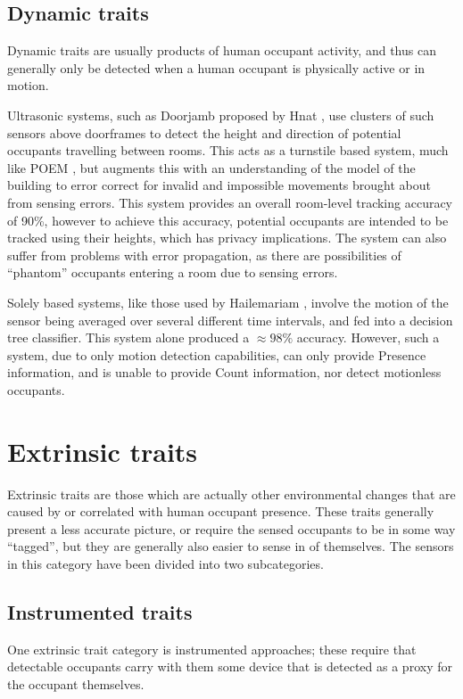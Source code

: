 \documentclass[../thesis/thesis.tex]{subfiles}
\begin{document}
\subsection{Dynamic traits}
\label{subsubsec:litreview:sensors:intrinsic:dynamic}
Dynamic traits are usually products of human occupant activity, and thus can generally only be detected when a human occupant is physically active or in motion.

Ultrasonic systems, such as Doorjamb proposed by Hnat \etal \cite{hnat2012doorjamb}, use clusters of such sensors above doorframes to detect the height and direction of potential occupants travelling between rooms. This acts as a turnstile based system, much like POEM \cite{erickson2013poem}, but augments this with an understanding of the model of the building to error correct for invalid and impossible movements brought about from sensing errors. This system provides an overall room-level tracking accuracy of 90\%, however to achieve this accuracy, potential occupants are intended to be tracked using their heights, which has privacy implications. The system can also suffer from problems with error propagation, as there are possibilities of ``phantom'' occupants entering a room due to sensing errors.

Solely \pir based systems, like those used by Hailemariam \etal \cite{hailemariam2011real}, involve the motion of the sensor being averaged over several different time intervals, and fed into a decision tree classifier. This \pir system alone produced a $\approx98\%$ accuracy. However, such a system, due to only motion detection capabilities, can only provide Presence information, and is unable to provide Count information, nor detect motionless occupants.

\section{Extrinsic traits}
\label{subsec:litreview:sensors:extrinsic}
Extrinsic traits are those which are actually other environmental changes that are caused by or correlated with human occupant presence. These traits generally present a less accurate picture, or require the sensed occupants to be in some way ``tagged'', but they are generally also easier to sense in of themselves. The sensors in this category have been divided into two subcategories.

\subsection{Instrumented traits}
\label{subsubsec:litreview:sensors:extrinsic:instrumented}
One extrinsic trait category is instrumented approaches; these require that detectable occupants carry with them some device that is detected as a proxy for the occupant themselves.
\end{document}
